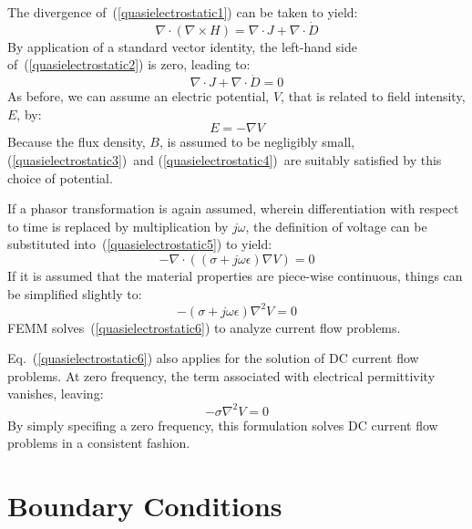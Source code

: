 \documentclass[12pt]{report}
\begin{document}
The divergence of~(\ref{quasielectrostatic1}) can be taken to yield:
\begin{equation} \label{quasielectrostatic2}
\nabla \cdot \left( \nabla \times H \right) = \nabla \cdot J + \nabla \cdot \dot{D}
\end{equation}
By application of a standard vector identity, the left-hand side 
of~(\ref{quasielectrostatic2})
is zero, leading to:
\begin{equation} \label{quasielectrostatic5}
\nabla \cdot J + \nabla \cdot \dot{D} = 0
\end{equation}
As before, we can assume an electric potential, $V$, that is related to field intensity,
$E$, by:
\begin{equation}
E = -\nabla V
\end{equation}
Because the flux density, $B$, is assumed to be negligibly small, (\ref{quasielectrostatic3})~and
(\ref{quasielectrostatic4})~are suitably satisfied by this choice of potential.

If a phasor transformation is again assumed, wherein differentiation with respect to time
is replaced by multiplication by $j \omega$, the definition of voltage can be substituted
into~(\ref{quasielectrostatic5}) to yield:
\begin{equation}
- \nabla \cdot \left( \left( \sigma + j \omega \epsilon \right) \nabla V \right) = 0
\end{equation}
If it is assumed that the material properties are piece-wise continuous, things can be
simplified slightly to:
\begin{equation}
\label{quasielectrostatic6}
- \left( \sigma + j \omega \epsilon \right) \nabla^2 V = 0
\end{equation}
FEMM solves~(\ref{quasielectrostatic6}) to analyze current flow problems.

Eq.~(\ref{quasielectrostatic6}) also applies for the solution of DC current flow problems.
At zero frequency, the term associated with electrical permittivity vanishes, leaving:
\begin{equation}
\label{quasielectrostatic7}
- \sigma \nabla^2 V = 0
\end{equation}
By simply specifing a zero frequency, this formulation solves DC current flow problems
in a consistent fashion.


\section{Boundary Conditions} \label{bcsection}
\end{document}
